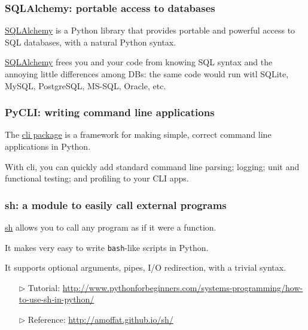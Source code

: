 \documentclass[english,serif,mathserif,xcolor=pdftex,dvipsnames,table]{beamer}
\begin{document}
\begin{frame}
  \frametitle{SQLAlchemy: portable access to databases}

  \href{http://www.sqlalchemy.org/}{SQLAlchemy} is a Python library
  that provides portable and powerful access to SQL databases, with a
  natural Python syntax.

  \+ \href{http://www.sqlalchemy.org/}{SQLAlchemy} frees you and your
  code from knowing SQL syntax and the annoying little differences
  among DBs: the same code would run witl SQLite, MySQL, PostgreSQL,
  MS-SQL, Oracle, etc.
\end{frame}

\begin{frame}
  \frametitle{PyCLI: writing command line applications}

  The \href{https://pypi.python.org/pypi/pyCLI}{cli package} is a
  framework for making simple, correct command line applications in
  Python.

  \+
  With cli, you can quickly add standard command line parsing;
  logging; unit and functional testing; and profiling to your CLI
  apps.
\end{frame}


\begin{frame}
  \frametitle{sh: a module to easily call external programs}

  \href{http://amoffat.github.com/sh/}{sh} allows you to call any
  program as if it were a function.

  \+

  It makes very easy to write \texttt{bash}-like scripts in Python.

  \+

  It supports optional arguments, pipes, I/O redirection, with a
  trivial syntax.

  \begin{seealso}
    \footnotesize
    \begin{itemize}
    \item[$\triangleright$]  Tutorial: \url{http://www.pythonforbeginners.com/systems-programming/how-to-use-sh-in-python/}
    \item[$\triangleright$] Reference: \url{http://amoffat.github.io/sh/}
    \end{itemize}
  \end{seealso}
\end{frame}
\end{document}
